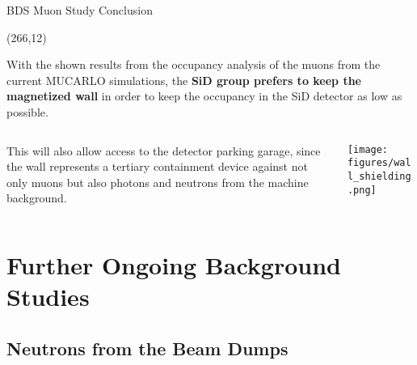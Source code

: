 \documentclass[xcolor={dvipsnames}]{beamer}
\newcommand{\proceedigBDS}{
  \setlength{\TPHorizModule}{1pt}
  \setlength{\TPVertModule}{1pt}
  \begin{textblock}{55}(266,12)
  \centering
  \textblockcolour{SpringGreen}
  \vspace*{0.8mm}{arXiv:\\1703.05738}\vspace*{0.8mm}
  \end{textblock}
}
\begin{document}
\begin{frame}{BDS Muon Study Conclusion}
\proceedigBDS
 With the shown results from the occupancy analysis of the muons from the current MUCARLO simulations, the \textbf{SiD group prefers to keep the magnetized wall} in order to keep the occupancy in the SiD detector as low as possible.
 \begin{columns}
  \begin{column}{0.4\textwidth}
    This will also allow access to the detector parking garage, since the wall represents a tertiary containment device against not only muons but also photons and neutrons from the machine background.
  \end{column}
  \begin{column}{0.6\textwidth}
    \texttt{[image: figures/wall\_shielding.png]}
  \end{column}
 \end{columns}
\end{frame}

\section{Further Ongoing Background Studies}

\subsection{Neutrons from the Beam Dumps}


\end{document}
